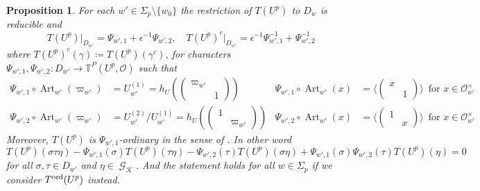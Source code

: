 \documentclass[leqno]{amsart}
\newtheorem{prop}[thm]{Proposition}
\theoremstyle{definition}
\theoremstyle{remark}
\newcommand{\smat}[1]{\left(\begin{smallmatrix} #1 \end{smallmatrix}\right)}
\newcommand{\oo}{\mathcal{O}}
\DeclareMathOperator{\Gal}{\mathcal{G}}
\DeclareMathOperator{\Art}{Art}
\newcommand{\K}{{\mathcal{K}}} %
\newcommand{\TT}{\mathbb{T}} %
\newcommand{\ord}{\textnormal{ord}} %
\begin{document}
\begin{prop}\label{prop:big_char_at_p}
    For each $w'\in \Sigma_p\setminus\{w_0\}$
    the restriction of $T(U^p)$ to $D_w$
    is reducible and 
    \[
        T(U^p)\vert_{D_{w'}}=\Psi_{w',1}+
        \epsilon^{-1}\Psi_{w',2},\quad
        T(U^p)^c\vert_{D_{w'}}=\epsilon^{-1}\Psi_{w',1}^{-1}+
        \Psi_{w',2}^{-1}
    \]
    where $T(U^p)^c(\gamma)\coloneqq T(U^p)(\gamma^c)$,
    for characters 
    $\Psi_{w',1},\Psi_{w',2}\colon D_{w'}\to \TT^P(U^p,\oo)$
    such that
	\begin{equation}
	\begin{aligned}\label{eq:big_char_atw'}
		\Psi_{w',1}\circ \Art_{w'}(\varpi_{w'})&=
		U_{w'}^{(1)}=h_U(\smat{\varpi_{w'}&\\&1}) &
		\Psi_{w',1}\circ \Art_{w'}(x)&=
		\langle 
		(\begin{smallmatrix}
			x&\\&1
		\end{smallmatrix})
		\rangle\, \text{ for }x\in \oo_{w'}^{\times}\\
		\Psi_{w',2}\circ \Art_{w'}(\varpi_{w'})&=
		U_{w'}^{(2)}/
		U_{w'}^{(1)} =h_U(\smat{1&\\&\varpi_{w'}}) &
		\Psi_{w',2}\circ \Art_{w'}(x)&=
		\langle 
		(\begin{smallmatrix}
			1&\\&x
		\end{smallmatrix})
		\rangle\, \text{ for }x\in \oo_{w'}^{\times}
	\end{aligned}
	\end{equation}
    Moreover, $T(U^p)$ is $\Psi_{w',1}$-ordinary 
    in the sense of \cite[Def 5.2.3]{pan}.
    In other word 
    \[
        T(U^p)(\sigma\tau\eta)
        -\Psi_{w',1}(\sigma)T(U^p)(\tau\eta)
        -\Psi_{w',2}(\tau)T(U^p)(\sigma\eta)
        +\Psi_{w',1}(\sigma)\Psi_{w',2}(\tau)T(U^p)(\eta)=0
    \]
    for all $\sigma, \tau\in D_{w'}$ and $\eta\in\Gal_\K$.
    And the statement holds for all $w\in \Sigma_p$
    if we consider $T^{\ord}(U^p)$ instead.
\end{prop}
\end{document}
